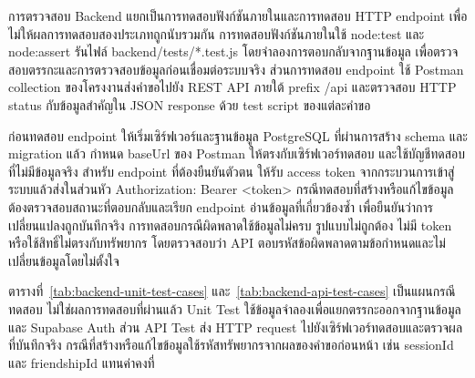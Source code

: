 การตรวจสอบ Backend แยกเป็นการทดสอบฟังก์ชันภายในและการทดสอบ HTTP endpoint เพื่อไม่ให้ผลการทดสอบสองประเภทถูกนับรวมกัน การทดสอบฟังก์ชันภายในใช้ node:test และ node:assert รันไฟล์ backend/tests/*.test.js โดยจำลองการตอบกลับจากฐานข้อมูล เพื่อตรวจสอบตรรกะและการตรวจสอบข้อมูลก่อนเชื่อมต่อระบบจริง ส่วนการทดสอบ endpoint ใช้ Postman collection ของโครงงานส่งคำขอไปยัง REST API ภายใต้ prefix /api และตรวจสอบ HTTP status กับข้อมูลสำคัญใน JSON response ด้วย test script ของแต่ละคำขอ

ก่อนทดสอบ endpoint ให้เริ่มเซิร์ฟเวอร์และฐานข้อมูล PostgreSQL ที่ผ่านการสร้าง schema และ migration แล้ว กำหนด baseUrl ของ Postman ให้ตรงกับเซิร์ฟเวอร์ทดสอบ และใช้บัญชีทดสอบที่ไม่มีข้อมูลจริง สำหรับ endpoint ที่ต้องยืนยันตัวตน ให้รับ access token จากกระบวนการเข้าสู่ระบบแล้วส่งในส่วนหัว Authorization: Bearer <token> กรณีทดสอบที่สร้างหรือแก้ไขข้อมูลต้องตรวจสอบสถานะที่ตอบกลับและเรียก endpoint อ่านข้อมูลที่เกี่ยวข้องซ้ำ เพื่อยืนยันว่าการเปลี่ยนแปลงถูกบันทึกจริง การทดสอบกรณีผิดพลาดใช้ข้อมูลไม่ครบ รูปแบบไม่ถูกต้อง ไม่มี token หรือใช้สิทธิ์ไม่ตรงกับทรัพยากร โดยตรวจสอบว่า API ตอบรหัสข้อผิดพลาดตามข้อกำหนดและไม่เปลี่ยนข้อมูลโดยไม่ตั้งใจ

\enlargethispage{\baselineskip}
ตารางที่~\ref{tab:backend-unit-test-cases} และ~\ref{tab:backend-api-test-cases} เป็นแผนกรณีทดสอบ ไม่ใช่ผลการทดสอบที่ผ่านแล้ว Unit Test ใช้ข้อมูลจำลองเพื่อแยกตรรกะออกจากฐานข้อมูลและ Supabase Auth ส่วน API Test ส่ง HTTP request ไปยังเซิร์ฟเวอร์ทดสอบและตรวจผลที่บันทึกจริง กรณีที่สร้างหรือแก้ไขข้อมูลใช้รหัสทรัพยากรจากผลของคำขอก่อนหน้า เช่น sessionId และ friendshipId แทนค่าคงที่

